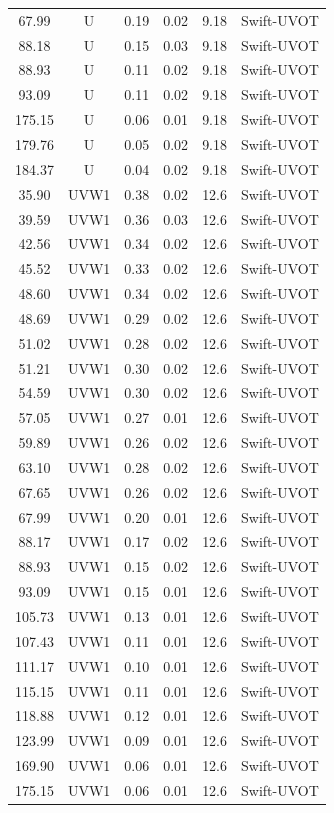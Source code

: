 \documentclass{nature_plusfigure}
\begin{document}
\begin{methods}
\begin{longtable}{|c|c|c|c|c|c|}
67.99&U&0.19&0.02&9.18&Swift{-}UVOT\\%
88.18&U&0.15&0.03&9.18&Swift{-}UVOT\\%
88.93&U&0.11&0.02&9.18&Swift{-}UVOT\\%
93.09&U&0.11&0.02&9.18&Swift{-}UVOT\\%
175.15&U&0.06&0.01&9.18&Swift{-}UVOT\\%
179.76&U&0.05&0.02&9.18&Swift{-}UVOT\\%
184.37&U&0.04&0.02&9.18&Swift{-}UVOT\\%
35.90&UVW1&0.38&0.02&12.6&Swift{-}UVOT\\%
39.59&UVW1&0.36&0.03&12.6&Swift{-}UVOT\\%
42.56&UVW1&0.34&0.02&12.6&Swift{-}UVOT\\%
45.52&UVW1&0.33&0.02&12.6&Swift{-}UVOT\\%
48.60&UVW1&0.34&0.02&12.6&Swift{-}UVOT\\%
48.69&UVW1&0.29&0.02&12.6&Swift{-}UVOT\\%
51.02&UVW1&0.28&0.02&12.6&Swift{-}UVOT\\%
51.21&UVW1&0.30&0.02&12.6&Swift{-}UVOT\\%
54.59&UVW1&0.30&0.02&12.6&Swift{-}UVOT\\%
57.05&UVW1&0.27&0.01&12.6&Swift{-}UVOT\\%
59.89&UVW1&0.26&0.02&12.6&Swift{-}UVOT\\%
63.10&UVW1&0.28&0.02&12.6&Swift{-}UVOT\\%
67.65&UVW1&0.26&0.02&12.6&Swift{-}UVOT\\%
67.99&UVW1&0.20&0.01&12.6&Swift{-}UVOT\\%
88.17&UVW1&0.17&0.02&12.6&Swift{-}UVOT\\%
88.93&UVW1&0.15&0.02&12.6&Swift{-}UVOT\\%
93.09&UVW1&0.15&0.01&12.6&Swift{-}UVOT\\%
105.73&UVW1&0.13&0.01&12.6&Swift{-}UVOT\\%
107.43&UVW1&0.11&0.01&12.6&Swift{-}UVOT\\%
111.17&UVW1&0.10&0.01&12.6&Swift{-}UVOT\\%
115.15&UVW1&0.11&0.01&12.6&Swift{-}UVOT\\%
118.88&UVW1&0.12&0.01&12.6&Swift{-}UVOT\\%
123.99&UVW1&0.09&0.01&12.6&Swift{-}UVOT\\%
169.90&UVW1&0.06&0.01&12.6&Swift{-}UVOT\\%
175.15&UVW1&0.06&0.01&12.6&Swift{-}UVOT\\%

\end{longtable}
\end{methods}
\end{document}
